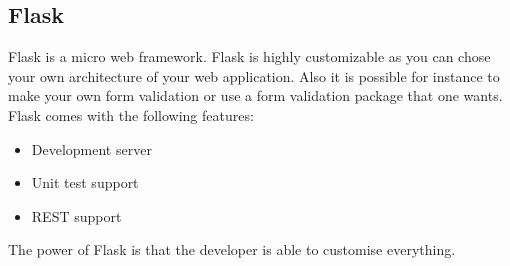 \subsection{Flask}
Flask\cite{flask_official} is a micro web framework.
Flask is highly customizable as you can chose your own architecture of your web application.
Also it is possible for instance to make your own form validation or use a form validation package that one wants.
Flask comes with the following features:
\begin{itemize}
\item Development server
\item Unit test support
\item REST support
\end{itemize}
The power of Flask is that the developer is able to customise everything.
